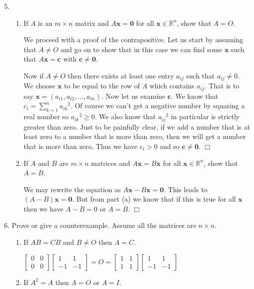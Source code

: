\documentclass[letterpaper]{article}
\begin{document}
\begin{enumerate}
\setcounter{enumi}{4}
\item
  \begin{enumerate}
  \item
  If $A$ is an $m\times n$ matrix and $A\mathbf{x}=\mathbf{0}$ for all $\mathbf{x}\in \mathbb{R}^n$, show that $A=O$.
  
  We proceed with a proof of the contrapositive. Let us start by assuming that $A\ne O$ and go on to show that in this case we can  find some $\mathbf{x}$ such  that $A\mathbf{x}=\mathbf{c}$ with $\mathbf{c}\ne \mathbf{0}$.

  Now if $A\ne O$ then there exists at least one entry $a_{ij}$ such that $a_{ij}\ne 0$. We choose $\mathbf{x}$ to be equal to the row of $A$ which  contains $a_{ij}$. That is to say $\mathbf{x}=(a_{i1},a_{i2},\dots,a_{in})$. Now let us examine $\mathbf{c}$. We know that $c_i=\sum\limits_{k=1}^n{{a_{ik}}^2}$. Of course we can't get a negative number by squaring a real number so ${a_{ik}}^2\ge0$. We also know that ${a_{ij}}^2$ in particular is strictly greater than zero. Just to be painfully clear, if we add a number that is at least zero to a number that is more than zero, then we will get a number that is more than zero. Thus we have $c_i>0$ and so $\mathbf{c}\ne \mathbf{0}$.
  $\Box$
  \item
  If $A$ and $B$ are $m\times n$ matrices and $A\mathbf{x}=B\mathbf{x}$ for all $\mathbf{x}\in \mathbb{R}^n$, show that $A=B$.

  We may rewrite the equation as $A\mathbf{x}-B\mathbf{x}=\mathbf{0}$. This leads to $(A-B)\mathbf{x}=\mathbf{0}$. But from part (a) we know that if this is true for all $\mathbf{x}$ then we have $A-B=0$ or $A=B$.
  $\Box$
  \end{enumerate}
\item
Prove or give a counterexample. Assume all the matrices are $n\times n$.
  \begin{enumerate}
  \item
  If $AB=CB$ and $B\ne O$ then $A=C$.

  $\displaystyle \left[\begin{array}{cc}0&0\\0&0\end{array}\right]
  \left[\begin{array}{cc}1&1\\-1&-1\end{array}\right]=
  O=
  \displaystyle \left[\begin{array}{cc}1&1\\1&1\end{array}\right]
  \left[\begin{array}{cc}1&1\\-1&-1\end{array}\right]$
  \item
  If $A^2=A$ then $A=O$ or $A=I$.


\end{enumerate}
\end{enumerate}
\end{document}

